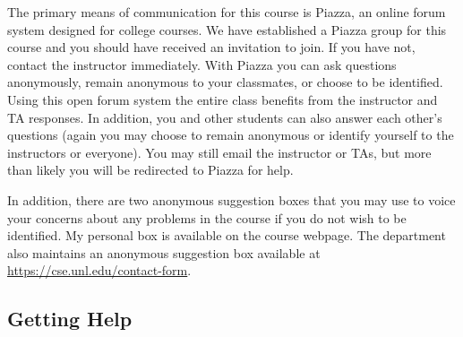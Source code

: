 \documentclass[12pt]{scrartcl}
\begin{document}
The primary means of communication for this course is Piazza, an online
forum system designed for college courses.  We have established a Piazza 
group for this course and you should have received an invitation to join.
If you have not, contact the instructor immediately.  With Piazza you 
can ask questions anonymously, remain anonymous to your classmates, or 
choose to be identified.  Using this open forum system the entire class 
benefits from the instructor and TA responses.  In addition, you and 
other students can also answer each other's questions (again you may
choose to remain anonymous or identify yourself to the instructors or
everyone).  You may still email the instructor or TAs, but more than 
likely you will be redirected to Piazza for help.

In addition, there are two anonymous suggestion boxes that you may 
use to voice your concerns about any problems in the course if you 
do not wish to be identified.  My personal box is available on the
course webpage.  The department also maintains an anonymous suggestion
box available at \url{https://cse.unl.edu/contact-form}.

\subsection{Getting Help}
\end{document}
